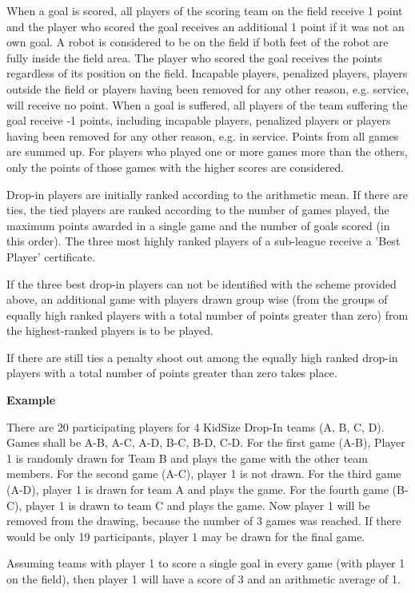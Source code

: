 When a goal is scored, all players of the scoring team on the field receive 1 point and the player who scored the goal receives an additional 1 point if it was not an own goal. A robot is considered to be on the field if both feet of the robot are fully inside the field area. The player who scored the goal receives the points regardless of its position on the field. Incapable players, penalized players, players outside the field or players having been removed for any other reason, e.g. service, will receive no point. When a goal is suffered, all players of the team suffering the goal receive -1 points, including incapable players, penalized players or players having been removed for any other reason, e.g. in service. Points from all games are summed up. For players who played one or more games more than the others, only the points of those games with the higher scores are considered.

Drop-in players are initially ranked according to the arithmetic mean.
If there are ties, the tied players are ranked according to the number of games played,
the maximum points awarded in a single game and the number of goals scored (in
this order).
The three most highly ranked players of a sub-league receive a 'Best Player' certificate.

If the three best drop-in players can not be identified with the scheme provided above, an additional game with players drawn group wise (from the groups of equally high ranked players with a total number of points greater than zero) from the highest-ranked players is to be played.

If there are still ties a penalty shoot out among the equally high ranked drop-in players with a total number of points greater than zero takes place.

\bigskip 
 
{\bfseries Example}
 
There are 20 participating players for 4 KidSize Drop-In teams (A, B, C, D). Games shall be A-B, A-C, A-D, B-C, B-D, C-D. For the first game (A-B), Player 1 is randomly drawn for Team B and plays the game with the other team members. For the second game (A-C), player 1 is not drawn. For the third game (A-D), player 1 is drawn for team A and plays the game. For the fourth game (B-C), player 1 is drawn to team C and plays the game. Now player 1 will be removed from the drawing, because the number of 3 games was reached. If there would be only 19 participants, player 1 may be drawn for the final game.

Assuming teams with player 1 to score a single goal in every game (with player 1 on the field), then player 1 will have a score of 3 and an arithmetic average of 1.

